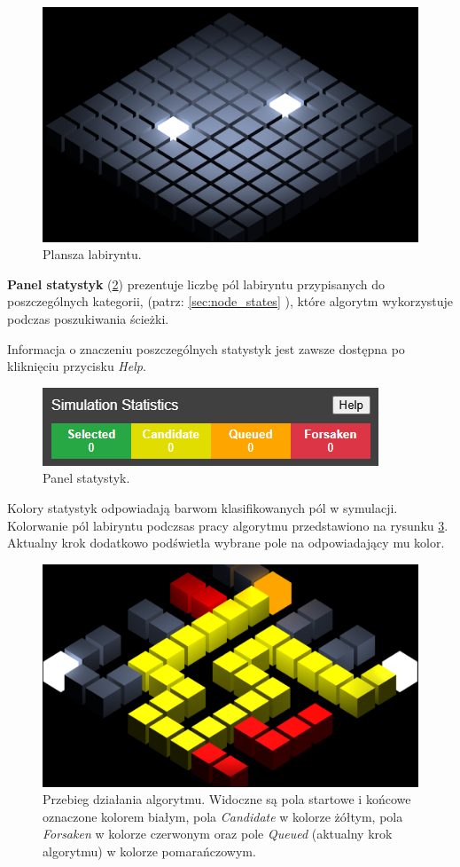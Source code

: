 \documentclass[../doc.tex]{subfiles}
\begin{document}
\begin{figure}[H]
  \centering
  \includegraphics[width=0.85\linewidth]{figures/field.png}
  \caption{Plansza labiryntu.}
  \label{fig:field}
\end{figure}

\textbf{Panel statystyk} (\cref{fig:stats})
prezentuje liczbę pól labiryntu przypisanych do poszczególnych kategorii, (patrz: \ref{sec:node_states} ), które algorytm wykorzystuje podczas poszukiwania ścieżki.



\noindent Informacja o znaczeniu poszczególnych statystyk jest zawsze dostępna po kliknięciu przycisku \textit{Help}.

\begin{figure}[H]
  \centering
  \includegraphics[width=0.6\linewidth]{figures/stats.png}
  \caption{Panel statystyk.}
  \label{fig:stats}
\end{figure}

Kolory statystyk odpowiadają barwom klasifikowanych pól w symulacji. Kolorwanie pól labiryntu podczsas pracy algorytmu przedstawiono na rysunku \ref{fig:colors}. Aktualny krok dodatkowo podświetla wybrane pole na odpowiadający mu kolor.

\begin{figure}[H]
  \centering
  \includegraphics[width=0.85\linewidth]{figures/colors.png}
  \caption{\centering Przebieg działania algorytmu. Widoczne są pola startowe i końcowe oznaczone kolorem białym, pola \textit{Candidate} w kolorze żółtym, pola \textit{Forsaken} w kolorze czerwonym oraz pole \textit{Queued} (aktualny krok algorytmu) w kolorze pomarańczowym.}
  \label{fig:colors}
\end{figure}
\end{document}
